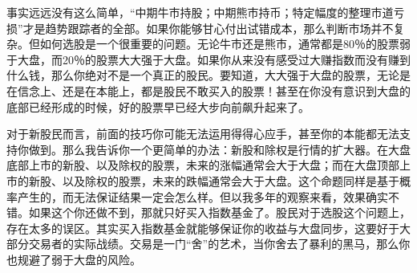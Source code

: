 事实远远没有这么简单，“中期牛市持股；中期熊市持币；特定幅度的整理市道亏损”才是趋势跟踪者的全部。如果你能够甘心付出试错成本，那么判断市场并不复杂。但如何选股是一个很重要的问题。无论牛市还是熊市，通常都是80％的股票弱于大盘，而20％的股票大大强于大盘。如果你从来没有感受过大赚指数而没有赚到什么钱，那么你绝对不是一个真正的股民。要知道，大大强于大盘的股票，无论是在信念上、还是在本能上，都是股民不敢买入的股票！甚至在你没有意识到大盘的底部已经形成的时候，好的股票早已经大步向前飙升起来了。

对于新股民而言，前面的技巧你可能无法运用得得心应手，甚至你的本能都无法支持你做到。那么我告诉你一个更简单的办法：新股和除权是行情的扩大器。在大盘底部上市的新股、以及除权的股票，未来的涨幅通常会大于大盘；而在大盘顶部上市的新股、以及除权的股票，未来的跌幅通常会大于大盘。这个命题同样是基于概率产生的，而无法保证结果一定会怎么样。但以我多年的观察来看，效果确实不错。如果这个你还做不到，那就只好买入指数基金了。股民对于选股这个问题上，存在太多的误区。其实买入指数基金就能够保证你的收益与大盘同步，这要好于大部分交易者的实际战绩。交易是一门“舍”的艺术，当你舍去了暴利的黑马，那么你也规避了弱于大盘的风险。

\clearpage
